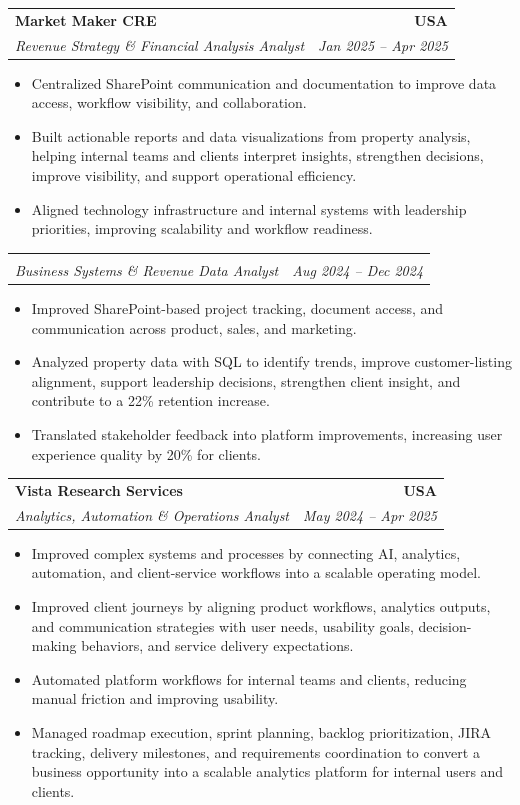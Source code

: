 \documentclass[letterpaper,10pt]{article}
\makeatletter
\newcommand{\resumeItem}[1]{\item \small{#1}}
\newcommand{\resumeSubheading}[4]{
  \vspace{1pt}\item
    \begin{tabular*}{1.0\textwidth}[t]{l@{\extracolsep{\fill}}r}
      \textbf{#1} & \textbf{\small #2} \\
      \textit{\small #3} & \textit{\small #4} \\
    \end{tabular*}\vspace{-6pt}
}
\newcommand{\resumeItemListStart}{\begin{itemize}[leftmargin=0.15in, itemsep=1pt, topsep=3pt]}
\newcommand{\resumeItemListEnd}{\end{itemize}\vspace{-2pt}}
\makeatother
\begin{document}
\vspace{-2pt}

\resumeSubheading
{Market Maker CRE}{USA}
{Revenue Strategy \& Financial Analysis Analyst}{Jan 2025 -- Apr 2025}
\resumeItemListStart
\resumeItem{Centralized SharePoint communication and documentation to improve data access, workflow visibility, and collaboration.}
\resumeItem{Built actionable reports and data visualizations from property analysis, helping internal teams and clients interpret insights, strengthen decisions, improve visibility, and support operational efficiency.}
\resumeItem{Aligned technology infrastructure and internal systems with leadership priorities, improving scalability and workflow readiness.}
\resumeItemListEnd

\vspace{-12pt}

\resumeSubheading
{}{}
{Business Systems \& Revenue Data Analyst}{Aug 2024 -- Dec 2024}
\resumeItemListStart
\resumeItem{Improved SharePoint-based project tracking, document access, and communication across product, sales, and marketing.}
\resumeItem{Analyzed property data with SQL to identify trends, improve customer-listing alignment, support leadership decisions, strengthen client insight, and contribute to a 22\% retention increase.}
\resumeItem{Translated stakeholder feedback into platform improvements, increasing user experience quality by 20\% for clients.}
\resumeItemListEnd

\vspace{-2pt}

\resumeSubheading
{Vista Research Services}{USA}
{Analytics, Automation \& Operations Analyst}{May 2024 -- Apr 2025}
\resumeItemListStart
\resumeItem{Improved complex systems and processes by connecting AI, analytics, automation, and client-service workflows into a scalable operating model.}
\resumeItem{Improved client journeys by aligning product workflows, analytics outputs, and communication strategies with user needs, usability goals, decision-making behaviors, and service delivery expectations.}
\resumeItem{Automated platform workflows for internal teams and clients, reducing manual friction and improving usability.}
\resumeItem{Managed roadmap execution, sprint planning, backlog prioritization, JIRA tracking, delivery milestones, and requirements coordination to convert a business opportunity into a scalable analytics platform for internal users and clients.}
\resumeItemListEnd

\vspace{-2pt}
\end{document}
